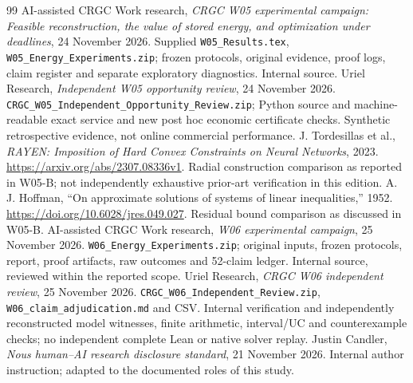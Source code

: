 \documentclass[11pt,letterpaper]{article}
\begin{document}
\begin{thebibliography}{99}
 AI-assisted CRGC Work research, \emph{CRGC W05 experimental campaign: Feasible reconstruction, the value of stored energy, and optimization under deadlines}, 24 November 2026. Supplied \texttt{W05\_Results.tex}, \texttt{W05\_Energy\_Experiments.zip}; frozen protocols, original evidence, proof logs, claim register and separate exploratory diagnostics. Internal source.
 Uriel Research, \emph{Independent W05 opportunity review}, 24 November 2026. \texttt{CRGC\_W05\_Independent\_Opportunity\_Review.zip}; Python source and machine-readable exact service and new post hoc economic certificate checks. Synthetic retrospective evidence, not online commercial performance.
 J. Tordesillas et al., \emph{RAYEN: Imposition of Hard Convex Constraints on Neural Networks}, 2023. \url{https://arxiv.org/abs/2307.08336v1}. Radial construction comparison as reported in W05-B; not independently exhaustive prior-art verification in this edition.
 A. J. Hoffman, ``On approximate solutions of systems of linear inequalities,'' 1952. \url{https://doi.org/10.6028/jres.049.027}. Residual bound comparison as discussed in W05-B.
 AI-assisted CRGC Work research, \emph{W06 experimental campaign}, 25 November 2026. \texttt{W06\_Energy\_Experiments.zip}; original inputs, frozen protocols, report, proof artifacts, raw outcomes and 52-claim ledger. Internal source, reviewed within the reported scope.
 Uriel Research, \emph{CRGC W06 independent review}, 25 November 2026. \texttt{CRGC\_W06\_Independent\_Review.zip}, \texttt{W06\_claim\_adjudication.md} and CSV. Internal verification and independently reconstructed model witnesses, finite arithmetic, interval/UC and counterexample checks; no independent complete Lean or native solver replay.
 Justin Candler, \emph{Nous human--AI research disclosure standard}, 21 November 2026. Internal author instruction; adapted to the documented roles of this study.
\end{thebibliography}
\end{document}
